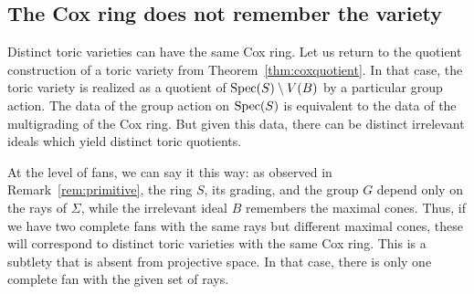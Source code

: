 \documentclass{amsart}
\begin{document}




\subsection{The Cox ring does not remember the variety}
Distinct toric varieties can have the same Cox ring.  Let us return to the quotient construction of a toric variety from Theorem~\ref{thm:coxquotient}.  In that case, the toric variety is realized as a quotient of $\operatorname{Spec}(S) \setminus V(B)$ by a particular group action.  The data of the group action on $\operatorname{Spec}(S)$ is equivalent to the data of the multigrading of the Cox ring.  But given this data, there can be distinct irrelevant ideals which yield distinct toric quotients.

At the level of fans, we can say it this way:  as observed in Remark~\ref{rem:primitive}, the ring $S$, its grading, and the group $G$ depend only on the rays of $\Sigma$, while the irrelevant ideal $B$ remembers the maximal cones.  Thus, if we have two complete fans with the same rays but different maximal cones, these will correspond to distinct toric varieties with the same Cox ring.   This is a subtlety that is absent from projective space. In that case, there is only one complete fan with the given set of rays.
\end{document}
